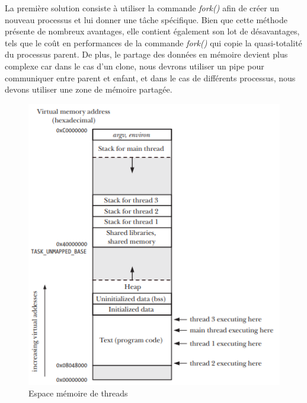 La première solution consiste à utiliser la commande \textit{fork()} afin de créer un nouveau processus et lui donner une tâche spécifique. Bien que cette méthode présente de nombreux avantages, elle contient également son lot de désavantages, tels que le coût en performances de la commande \textit{fork()} qui copie la quasi-totalité du processus parent. De plus, le partage des données en mémoire devient plus complexe car dans le cas d’un clone, nous devrons utiliser un pipe pour communiquer entre parent et enfant, et dans le cas de différents processus, nous devons utiliser une zone de mémoire partagée.

\begin{figure}[ht]
  \centering
  \includegraphics[width=0.8\linewidth]{thread_memory.png}
  \caption{Espace mémoire de threads}
  \label{fig:thread_memory}
\end{figure}
\vspace{\baselineskip}

